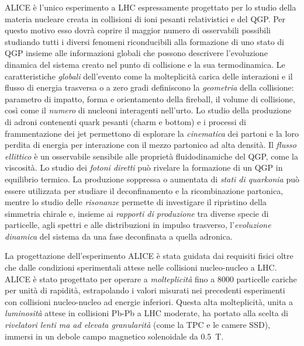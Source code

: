         ALICE è l’unico esperimento a LHC espressamente progettato per lo studio della materia nucleare creata in collisioni di ioni pesanti relativistici e del QGP. Per questo motivo esso dovrà coprire il maggior numero di osservabili possibili studiando tutti i diversi fenomeni riconducibili alla formazione di uno stato di QGP insieme alle informazioni globali che possono descrivere l’evoluzione dinamica del sistema creato nel punto di collisione e la sua termodinamica. Le caratteristiche \textit{globali} dell’evento come la molteplicità carica delle interazioni e il flusso di energia trasversa o a zero gradi definiscono la \textit{geometria} della collisione: parametro di impatto, forma e orientamento della fireball, il volume di collisione, così come il \textit{numero} di nucleoni interagenti nell’urto. Lo studio della produzione di adroni contenenti quark pesanti (charm e bottom) e i processi di frammentazione dei jet permettono di esplorare la \textit{cinematica} dei partoni e la loro perdita di energia per interazione con il mezzo partonico ad alta densità. Il \textit{flusso ellittico} è un osservabile sensibile alle proprietà fluidodinamiche del QGP, come la viscosità. Lo studio dei \textit{fotoni diretti} può rivelare la formazione di un QGP in equilibrio termico. La produzione soppressa o aumentata di \textit{stati di quarkonia} può essere utilizzata per studiare il deconfinamento e la ricombinazione partonica, mentre lo studio delle \textit{risonanze} permette di investigare il ripristino della simmetria chirale e, insieme ai \textit{rapporti di produzione} tra diverse specie di particelle, agli spettri e alle distribuzioni in impulso trasverso, l’\textit{evoluzione dinamica} del sistema da una fase deconfinata a quella adronica.

        La progettazione dell’esperimento ALICE è stata guidata dai requisiti fisici oltre che dalle condizioni sperimentali attese nelle collisioni nucleo-nucleo a LHC. ALICE è stato progettato per operare a \textit{molteplicità} fino a 8000 particelle cariche per unità di rapidità, estrapolando i valori misurati nei precedenti esperimenti con collisioni nucleo-nucleo ad energie inferiori. Questa alta molteplicità, unita a \textit{luminosità} attese in collisioni Pb-Pb a LHC moderate, ha portato alla scelta di \textit{rivelatori lenti ma ad elevata granularità} (come la TPC e le camere SSD), immersi in un debole campo magnetico solenoidale da \qty{0.5}{\tesla}.

